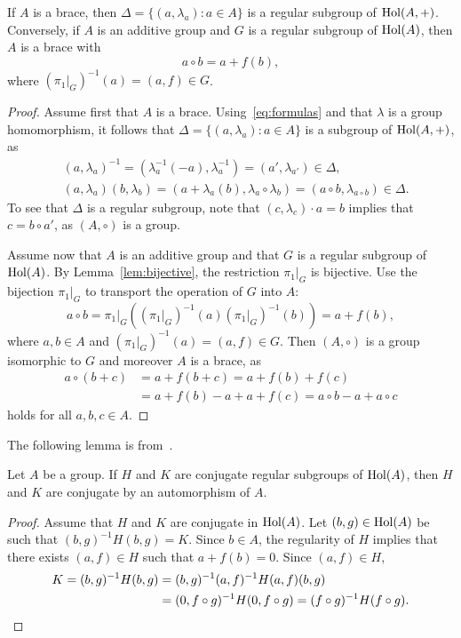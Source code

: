 \begin{theorem}
\label{thm:regular}
	If $A$ is a brace, then $\Delta=\{(a,\lambda_a):a\in A\}$ is a regular subgroup of 
	$\operatorname{Hol}(A,+)$. Conversely, if $A$ is an additive group and 
	$G$ is a regular subgroup of $\operatorname{Hol}(A)$, then $A$ is 
	a brace with 
	\[
		a\circ b=a+f(b),
	\]
	where $(\pi_1|_G)^{-1}(a)=(a,f)\in G$. 
\end{theorem}

\begin{proof}
    Assume first that $A$ is a brace. 
    Using~\eqref{eq:formulas} and that 
    $\lambda$ is a group homomorphism, it follows that
    $\Delta=\{(a,\lambda_a):a\in A\}$ is a subgroup of $\operatorname{Hol}(A,+)$, as 
    \begin{align*}
    &(a,\lambda_a)^{-1}=(\lambda^{-1}_a(-a),\lambda^{-1}_a)=(a',\lambda_{a'})\in\Delta,\\
    &(a,\lambda_a)(b,\lambda_b)=(a+\lambda_a(b),\lambda_a\circ\lambda_b)=(a\circ b,\lambda_{a\circ b})\in\Delta.    
    \end{align*}
    To see that $\Delta$ is a regular subgroup, note that $(c,\lambda_c)\cdot a=b$ 
    implies that $c=b\circ a'$, as $(A,\circ)$ is a group. 

	Assume now that $A$ is an additive group and that 
	$G$ is a regular subgroup of $\operatorname{Hol}(A)$. By Lemma~\ref{lem:bijective}, the restriction 
	$\pi_1|_G$ is bijective.  Use the bijection $\pi_1|_G$ to transport the
	operation of $G$ into $A$: 
	\[
        a\circ b=\pi_1|_G\left((\pi_1|_G)^{-1}(a)(\pi_1|_G)^{-1}(b)\right)=a+f(b),
	\]
	where $a,b\in A$ and $(\pi_1|_G)^{-1}(a)=(a,f)\in G$. 
	Then $(A,\circ)$ is a group isomorphic to $G$ and moreover $A$ is a brace, as 
	\begin{align*}
		a\circ (b+c)&=a+f(b+c)=a+f(b)+f(c)\\
		&=a+f(b)-a+a+f(c)=a\circ b-a+a\circ c
	\end{align*}
	holds for all $a,b,c\in A$. 
\end{proof}

The following lemma is from~\cite{MR4113853}.

\begin{lemma}
\label{lem:BNY}
    Let $A$ be a group. If $H$ and $K$ are conjugate regular subgroups of $\operatorname{Hol}(A)$, then $H$ and $K$ are conjugate 
    by an automorphism of $A$. 
\end{lemma}

\begin{proof}
    Assume that $H$ and $K$ are conjugate in $\operatorname{Hol}(A)$. Let $(b,g)\in\operatorname{Hol}(A)$ be such that $(b,g)^{-1}H(b,g)=K$. 
    Since $b\in A$, the regularity of $H$ implies that
    there exists $(a,f)\in H$ such that $a+f(b)=0$. Since $(a,f)\in H$, 
    \begin{align*}
    K=(b,g)^{-1}H(b,g)&=(b,g)^{-1}(a,f)^{-1}H(a,f)(b,g)\\
    &=(0,f\circ g)^{-1}H(0,f\circ g)=(f\circ g)^{-1}H(f\circ g).\qedhere
    \end{align*}
\end{proof}


